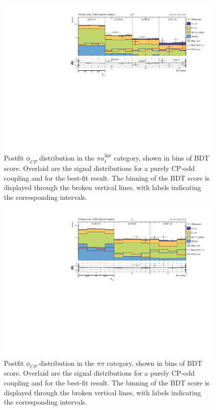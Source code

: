 \begin{figure}[!htbp]
    \centering
    \includegraphics[width=1\textwidth]{Figures/Chapter7/postfit/htt_tt_9_13p6TeV.pdf}
    \caption[Postfit $\phi_{CP}$ distribution in the $\pi a_1^\text{3pr}$ category.]
    {Postfit $\phi_{CP}$ distribution in the $\pi a_1^\text{3pr}$ category, shown in bins of \ac{BDT} score. Overlaid are the signal distributions for a purely CP-odd coupling and for the best-fit result. The binning of the BDT score is displayed through the broken vertical lines, with labels indicating the corresponding intervals.}
    \label{Figure:Chapter7_Postfit_Unrolled_4}
\end{figure}

\begin{figure}[!htbp]
    \centering
    \includegraphics[width=1\textwidth]{Figures/Chapter7/postfit/htt_tt_8_13p6TeV.pdf}
    \caption[Postfit $\phi_{CP}$ distribution in the $\pi \pi$ category.]
    {Postfit $\phi_{CP}$ distribution in the $\pi \pi$ category, shown in bins of \ac{BDT} score. Overlaid are the signal distributions for a purely CP-odd coupling and for the best-fit result. The binning of the BDT score is displayed through the broken vertical lines, with labels indicating the corresponding intervals.}
    \label{Figure:Chapter7_Postfit_Unrolled_5}
\end{figure}

